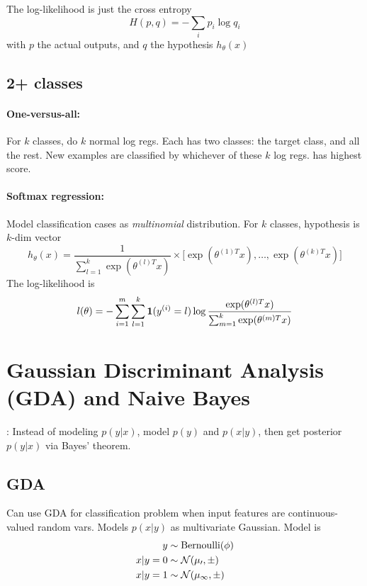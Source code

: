 \documentclass[11pt]{article}
\begin{document}
The log-likelihood is just the cross entropy
\begin{equation}
  H(p,q) = -\sum_i p_i \log q_i
\end{equation}
with $p$ the actual outputs, and $q$ the hypothesis $h_\theta(x)$

\subsection{2+ classes}

\paragraph{One-versus-all:} For $k$ classes, do $k$ normal log regs. Each has
two classes: the target class, and all the rest. New examples are classified by
whichever of these $k$ log regs. has highest score.

\paragraph{Softmax regression:} Model classification cases as \emph{multinomial}
distribution. For $k$ classes, hypothesis is $k$-dim vector
\begin{equation}
  h_\theta (x) = \frac{1}{\sum_{l=1}^k \exp(\theta^{(l)T} x)} \times
  \big[\exp(\theta^{(1)T} x), \dots, \exp(\theta^{(k)T} x)\big]
\end{equation}
The log-likelihood is
\begin{equation}
  l(\theta) = - \sum_{i=1}^m \sum_{l=1}^k
  \mathbf{1}(y^{(i)} = l)
  \log \frac{\exp(\theta^{(l)T} x)}{\sum_{m=1}^k \exp(\theta^{(m)T} x)}
\end{equation}




\section{Gaussian Discriminant Analysis (GDA) and Naive Bayes}
\label{sec:GDA_nbayes}
: Instead of modeling $p(y|x)$, model $p(y)$ and
$p(x|y)$, then get posterior $p(y|x)$ via Bayes' theorem.

\subsection{GDA}
Can use GDA for classification problem when input features are continuous-valued
random vars. Models $p(x|y)$ as multivariate Gaussian. Model is
\begin{align}
  y &\sim \textrm{Bernoulli}(\phi) \\
  x|y=0 &\sim \mathcal{N(\mu_0, \Sigma)} \\
  x|y=1 &\sim \mathcal{N(\mu_1, \Sigma)}
\end{align}
\end{document}
